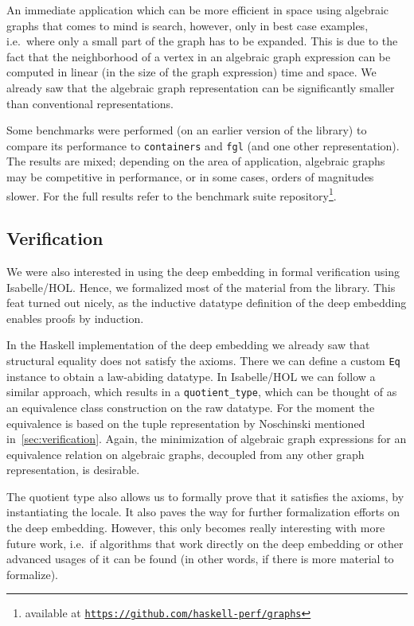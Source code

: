 \documentclass{article}
\newcommand{\hs}{\texttt}
\begin{document}
An immediate application which can be more efficient in space using
algebraic graphs that comes to mind is search, however, only in best case
examples, i.e.\ where only a small part of the graph has to be expanded. This is
due to the fact that the neighborhood of a vertex in an algebraic graph
expression can be computed in linear (in the size of the graph expression) time
and space. We already saw that the algebraic graph representation can be
significantly smaller than conventional representations.

Some benchmarks were performed (on an earlier version of the library) to compare
its performance to \texttt{containers} and \texttt{fgl} (and one other
representation). The results are mixed; depending on the area of application,
algebraic graphs may be competitive in performance, or in some cases, orders of
magnitudes slower. For the full results refer to the benchmark suite
repository\footnote{available at
  \texttt{\href{https://github.com/haskell-perf/graphs}{https://github.com/haskell-perf/graphs}}}.
\subsection{Verification}\label{sec:quotient}
We were also interested in using the deep embedding in formal verification using
Isabelle/HOL. Hence, we formalized most of the material from the library. This
feat turned out nicely, as the inductive datatype definition of the deep
embedding enables proofs by induction.

In the Haskell implementation of the deep embedding we already saw that
structural equality does not satisfy the axioms. There we can define a custom
\hs{Eq} instance to obtain a law-abiding datatype. In Isabelle/HOL we can follow
a similar approach, which results in a \texttt{quotient\_type}, which can be
thought of as an equivalence class construction on the raw datatype. For the
moment the equivalence is based on the tuple representation by Noschinski
mentioned in~\autoref{sec:verification}. Again, the minimization of algebraic
graph expressions for an equivalence relation on algebraic graphs, decoupled
from any other graph representation, is desirable.

The quotient type also allows us to formally prove that it satisfies the axioms,
by instantiating the locale. It also paves the way for further formalization
efforts on the deep embedding. However, this only becomes really interesting
with more future work, i.e.\ if algorithms that work directly on the deep
embedding or other advanced usages of it can be found (in other words, if there
is more material to formalize).
\end{document}
